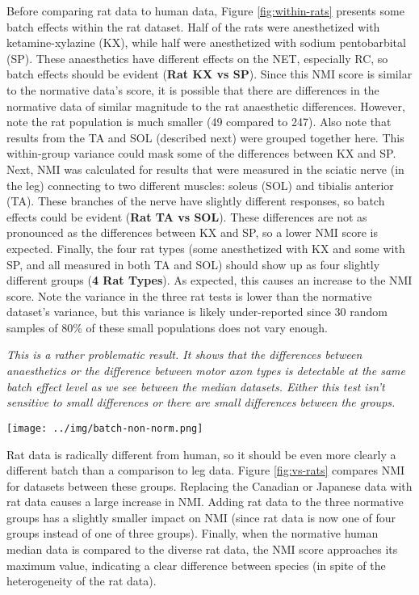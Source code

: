 \documentclass[12pt]{article}
\begin{document}
Before comparing rat data to human data, Figure \ref{fig:within-rats} presents some batch effects within the rat dataset. Half of the rats were anesthetized with ketamine-xylazine (KX), while half were anesthetized with sodium pentobarbital (SP). These anaesthetics have different effects on the NET, especially RC, so batch effects should be evident (\textbf{Rat KX vs SP}). Since this NMI score is similar to the normative data's score, it is possible that there are differences in the normative data of similar magnitude to the rat anaesthetic differences. However, note the rat population is much smaller (49 compared to 247). Also note that results from the TA and SOL (described next) were grouped together here. This within-group variance could mask some of the differences between KX and SP.
Next, NMI was calculated for results that were measured in the sciatic nerve (in the leg) connecting to two different muscles: soleus (SOL) and tibialis anterior (TA). These branches of the nerve have slightly different responses, so batch effects could be evident (\textbf{Rat TA vs SOL}). These differences are not as pronounced as the differences between KX and SP, so a lower NMI score is expected.
Finally, the four rat types (some anesthetized with KX and some with SP, and all measured in both TA and SOL) should show up as four slightly different groups (\textbf{4 Rat Types}). As expected, this causes an increase to the NMI score.
Note the variance in the three rat tests is lower than the normative dataset's variance, but this variance is likely under-reported since 30 random samples of 80\% of these small populations does not vary enough.

\emph{This is a rather problematic result. It shows that the differences between anaesthetics or the difference between motor axon types is detectable at the same batch effect level as we see between the median datasets. Either this test isn't sensitive to small differences or there are small differences between the groups.}

\pagebreak

\begin{figure*}
  \centering
       \texttt{[image: ../img/batch-non-norm.png]}
         \caption{}
  \label{fig:vs-rats}
\end{figure*}

\pagebreak

Rat data is radically different from human, so it should be even more clearly a different batch than a comparison to leg data.  Figure \ref{fig:vs-rats} compares NMI for datasets between these groups. Replacing the Canadian or Japanese data with rat data causes a large increase in NMI. Adding rat data to the three normative groups has a slightly smaller impact on NMI (since rat data is now one of four groups instead of one of three groups). Finally, when the normative human median data is compared to the diverse rat data, the NMI score approaches its maximum value, indicating a clear difference between species (in spite of the heterogeneity of the rat data).
\end{document}
